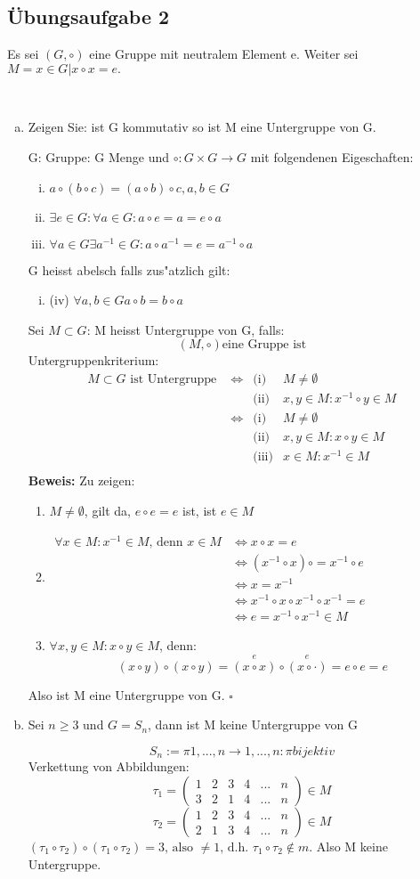 \documentclass[a4paper,twoside,DIV15,BCOR12mm]{scrbook}
\newcommand{\enue}{\ \begin{enumerate}[(1)]}
\newcommand{\enur}{\ \begin{enumerate}[(i)]}
\newcommand{\enua}{\ \begin{enumerate}[a)]}
\newcommand{\une}{\end{enumerate}}
\newcommand{\LRA}{\Leftrightarrow}
\newcommand{\x}{\cdot}
\providecommand{\matr}[1]{\begin{pmatrix}#1\end{pmatrix}}
\newenvironment{bew}{\pagebreak[2]\textbf{Beweis: }}{\qed}
\renewcommand{\qed}{\hspace*{\fill} \ensuremath{\square}}
\begin{document}
\subsection {Übungsaufgabe 2}
Es sei $(G,\circ)$ eine Gruppe mit neutralem Element e. Weiter sei $M={x\in G|x\circ x=e}.$\par
\enua\item
Zeigen Sie: ist G kommutativ so ist M eine Untergruppe von G.\par
G: Gruppe: G Menge und $\circ:G\times G\to G$ mit folgendenen Eigeschaften:
\enur
\item $a\circ(b\circ c)=(a\circ b)\circ c, a,b\in G$
\item $\exists e\in G:\forall a\in G: a\circ e=a=e\circ a$
\item $\forall a\in G\exists a^{-1}\in G: a\circ a^{-1}=e=a^{-1}\circ a$
\une
G heisst abelsch falls zus"atzlich gilt:
\enur
\item (iv) $\forall a,b\in G a\circ b=b\circ a$
\une
Sei $M\subset G$: M heisst Untergruppe von G, falls:
\[(M,\circ)\text{eine Gruppe ist}\]
Untergruppenkriterium:
\[\begin{array}{llcl}
  M\subset G\text{ ist Untergruppe } & \LRA & \text{(i)} & M\neq\emptyset\\
  & & \text{(ii)} & x,y\in M: x^{-1}\circ y\in M\\
  & \LRA & \text{(i) } & M\neq\emptyset\\
  & & \text{(ii)} & x,y\in M: x\circ y\in M\\
  & & \text{(iii)} & x\in M: x^{-1}\in M\\
\end{array}
\]
\begin{bew}
Zu zeigen:
\enue\item $M\neq\emptyset$, gilt da, $e\circ e=e$ ist, ist $e\in M$
\item
$\begin{array}{ll}\forall x\in M: x^{-1}\in M\text{, denn }x\in M & \LRA x\circ x=e\\
& \LRA (x^{-1}\circ x)\circ =x^{-1}\circ e\\
& \LRA x=x^{-1}\\
& \LRA x^{-1}\circ x\circ x^{-1}\circ x^{-1}=e\\
& \LRA e=x^{-1}\circ x^{-1}\in M
\end{array}$
\item $\forall x,y\in M: x\circ y\in M$, denn:
\[(x\circ y)\circ(x\circ y)=\overset e{(x\circ x)}\circ\overset e{(x\circ\x)}=e\circ e=e\]
\une
Also ist M eine Untergruppe von G.
\end{bew}
\item
Sei $n\ge 3$ und $G=S_n$, dann ist M keine Untergruppe von G\par
\[S_n:={\pi{1,...,n}\to{1,...,n}: \pi bijektiv}\]
Verkettung von Abbildungen:
\[\tau_1=\matr{1 & 2 & 3 & 4 & ... & n\\3 & 2 & 1 & 4 & ... & n}\in M\]
\[\tau_2=\matr{1 & 2 & 3 & 4 & ... & n\\2 & 1 & 3 & 4 & ... & n}\in M\]
$(\tau_1\circ\tau_2)\circ(\tau_1\circ\tau_2)=3\text{, also }\neq1\text{, d.h. }\tau_1\circ\tau_2\notin m$. Also M keine Untergruppe.
\une
\end{document}
